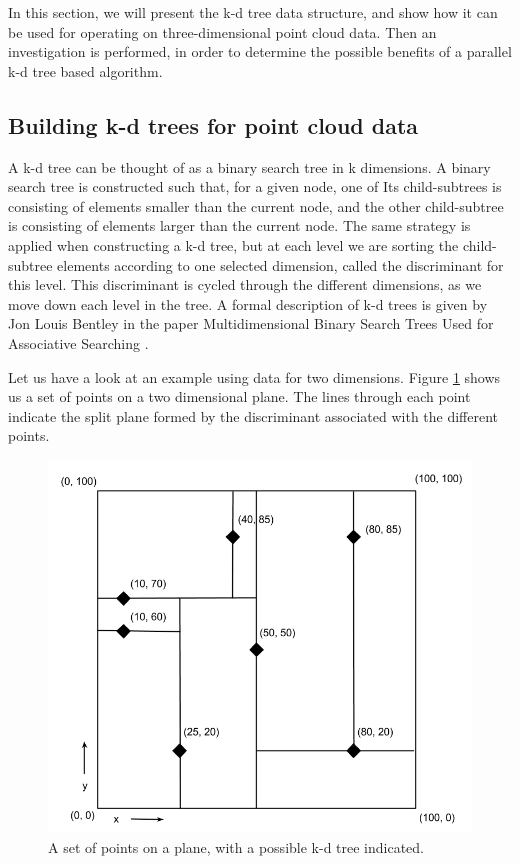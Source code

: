 In this section, we will present the k-d tree data structure, and show how it can be used for operating on three-dimensional point cloud data. Then an investigation is performed, in order to determine the possible benefits of a parallel k-d tree based algorithm.


\subsection{Building k-d trees for point cloud data} %
\label{ssub:building_k_d_trees_for_point_cloud_data}

A k-d tree can be thought of as a binary search tree in k dimensions. A binary search tree is constructed such that, for a given node, one of Its child-subtrees is consisting of elements smaller than the current node, and the other child-subtree is consisting of elements larger than the current node. The same strategy is applied when constructing a k-d tree, but at each level we are sorting the child-subtree elements according to one selected dimension, called the discriminant for this level. This discriminant is cycled through the different dimensions, as we move down each level in the tree. A formal description of k-d trees is given by Jon Louis Bentley in the paper Multidimensional Binary Search Trees Used for Associative Searching \cite{Bentley:1975:MBS:361002.361007}.

Let us have a look at an example using data for two dimensions. Figure \ref{fig:kd_tree_2d_plane} shows us a set of points on a two dimensional plane. The lines through each point indicate the split plane formed by the discriminant associated with the different points.

\begin{figure}[ht!]
\centering
\includegraphics[width=120mm]{../gfx/kd_tree_illustration_graph.png}
\caption{A set of points on a plane, with a possible k-d tree indicated.}
\label{fig:kd_tree_2d_plane}
\end{figure}

